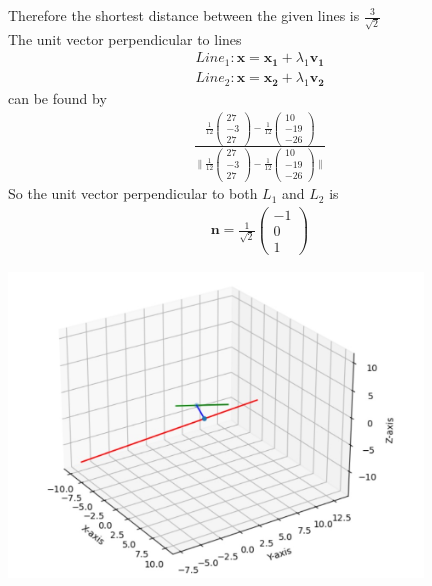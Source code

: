 \documentclass[journal,12pt,twocolumn]{IEEEtran}
\newcommand{\norm}[1]{\| #1 \|}
\begin{document}
Therefore the shortest distance between the given lines is $\frac{3}{\sqrt{2}}$\\
The unit vector perpendicular to lines \\
\begin{align}
    Line_1\colon \bm{x}=\bm{x_1}+\lambda_1\bm{v_1}\\
    Line_2\colon \bm{x}=\bm{x_2}+\lambda_1\bm{v_2}
\end{align}
can be found by 
\begin{align}
    \frac{\frac{1}{{12}}\begin{pmatrix}27\\-3\\27\end{pmatrix}-\frac{1}{{12}}\begin{pmatrix}10\\-19\\-26\end{pmatrix}}{\norm{\frac{1}{{12}}\begin{pmatrix}27\\-3\\27\end{pmatrix}-\frac{1}{{12}}\begin{pmatrix}10\\-19\\-26\end{pmatrix}}}
\end{align}
So the unit vector perpendicular to both $L_1$ and $L_2$ is
\begin{align}
    \bm{n}=\frac{1}{\sqrt{2}}\begin{pmatrix}-1\\0\\1\end{pmatrix}
\end{align}

\begin{center}
    \includegraphics[width=11cm]{assignment2.jpg}
\end{center}
\end{document}
